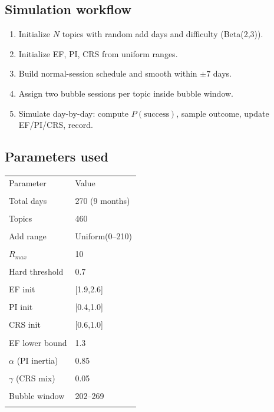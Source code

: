 \documentclass[12pt]{article}
\begin{document}
\subsection*{Simulation workflow}
\begin{enumerate}
  \item Initialize $N$ topics with random add days and difficulty (Beta(2,3)).
  \item Initialize EF, PI, CRS from uniform ranges.
  \item Build normal-session schedule and smooth within $\pm7$ days.
  \item Assign two bubble sessions per topic inside bubble window.
  \item Simulate day-by-day: compute $P(\text{success})$, sample outcome, update EF/PI/CRS, record.
\end{enumerate}

\subsection*{Parameters used}
\begin{tabular}{ll}
Parameter & Value \\\\
\hline
Total days & 270 (9 months) \\\\
Topics & 460 \\\\
Add range & Uniform(0--210) \\\\
$R_{max}$ & 10 \\\\
Hard threshold & 0.7 \\\\
EF init & [1.9,2.6] \\\\
PI init & [0.4,1.0] \\\\
CRS init & [0.6,1.0] \\\\
EF lower bound & 1.3 \\\\
$\alpha$ (PI inertia) & 0.85 \\\\
$\gamma$ (CRS mix) & 0.05 \\\\
Bubble window & 202--269 \\\\
\end{tabular}
\end{document}
